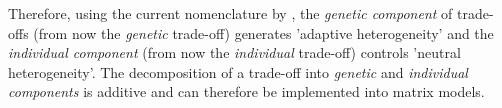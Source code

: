 \documentclass[10pt,a4paper]{article}
\begin{document}
Therefore, using the current nomenclature by \citet{Cam2016,Steiner2012,Hamel2018a}, the \emph{genetic component} of trade-offs (from now the \emph{genetic} trade-off) generates 'adaptive heterogeneity' and the \emph{individual component} (from now the \emph{individual} trade-off) controls 'neutral heterogeneity'. 
The decomposition of a trade-off into \emph{genetic} and \emph{individual components} is additive and can therefore be implemented into matrix models.\\ %


\end{document}
